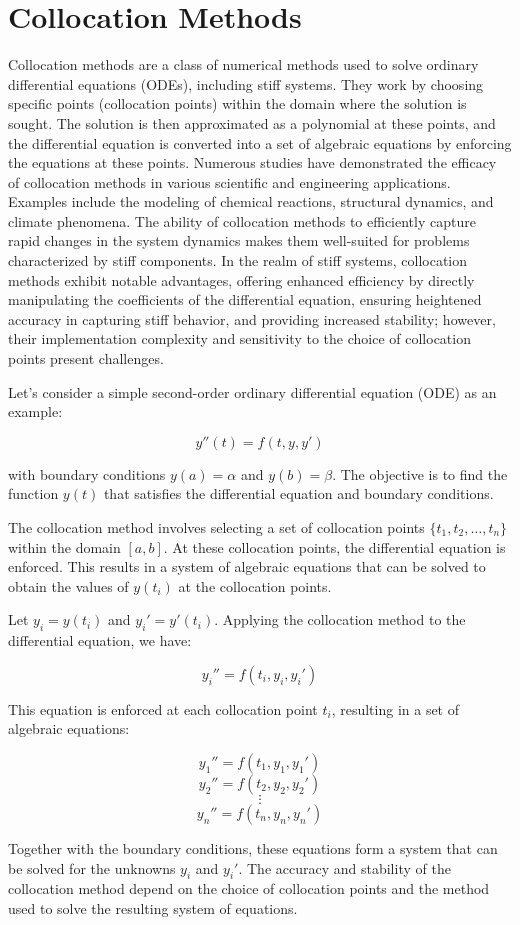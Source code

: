   

\section{Collocation Methods}
Collocation methods are a class of numerical methods used to solve ordinary differential equations (ODEs), including stiff systems. They work by choosing specific points (collocation points) within the domain where the solution is sought. The solution is then approximated as a polynomial at these points, and the differential equation is converted into a set of algebraic equations by enforcing the equations at these points.
Numerous studies have demonstrated the efficacy of collocation methods in various scientific and engineering applications. Examples include the modeling of chemical reactions, structural dynamics, and climate phenomena. The ability of collocation methods to efficiently capture rapid changes in the system dynamics makes them well-suited for problems characterized by stiff components.
In the realm of stiff systems, collocation methods exhibit notable advantages, offering enhanced efficiency by directly manipulating the coefficients of the differential equation, ensuring heightened accuracy in capturing stiff behavior, and providing increased stability; however, their implementation complexity and sensitivity to the choice of collocation points present challenges\cite{Faleichik2009ExplicitIO}.

Let's consider a simple second-order ordinary differential equation (ODE) as an example:

\[
y''(t) = f(t, y, y')
\]

with boundary conditions \(y(a) = \alpha\) and \(y(b) = \beta\). The objective is to find the function \(y(t)\) that satisfies the differential equation and boundary conditions.

The collocation method involves selecting a set of collocation points \(\{t_1, t_2, \ldots, t_n\}\) within the domain \([a, b]\). At these collocation points, the differential equation is enforced. This results in a system of algebraic equations that can be solved to obtain the values of \(y(t_i)\) at the collocation points.

Let \(y_i = y(t_i)\) and \(y_i' = y'(t_i)\). Applying the collocation method to the differential equation, we have:

\[
y_i'' = f(t_i, y_i, y_i')
\]

This equation is enforced at each collocation point \(t_i\), resulting in a set of algebraic equations:

\[
y_1'' = f(t_1, y_1, y_1')
\]
\[
y_2'' = f(t_2, y_2, y_2')
\]
\[
\vdots
\]
\[
y_n'' = f(t_n, y_n, y_n')
\]

Together with the boundary conditions, these equations form a system that can be solved for the unknowns \(y_i\) and \(y_i'\). The accuracy and stability of the collocation method depend on the choice of collocation points and the method used to solve the resulting system of equations.



